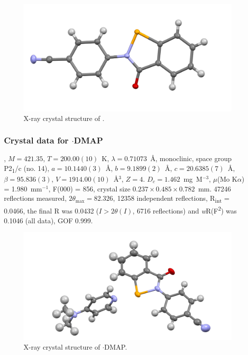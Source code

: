 \begin{refsection}
\begin{figure}
  \includegraphics[width=0.6\linewidth]{Figures/ebs-4cn-xtal.pdf}
  \caption{X-ray crystal structure of \texorpdfstring{}{C14 H8 N2 O Se}.}
\end{figure}

\subsubsection{Crystal data for \texorpdfstring{$ \cdot $DMAP}{C21 H18 N4 O Se}}
, $M=421.35$, $T=200.00(10)$~K, $ \lambda=0.71073 $~\AA, monoclinic, space group P2\textsubscript{1}/c (no. 14), $a = 10.1440(3)$~\AA, $b = 9.1899(2)$~\AA, $c = 20.6385(7)$~\AA, $\beta = 95.836(3)$\degree, $V = 1914.00(10)$~\AA$^{3}$, $Z = 4$. $D_{c}= 1.462$~mg~M$^{-3}$, $\mu$(Mo K$\alpha$) = 1.980~mm$^{-1}$, F(000) = 856, crystal size $0.237 \times 0.485 \times 0.782$~mm. 47246 reflections measured, $2\theta_{\max}=82.326$\degree, 12358 independent reflections, R\textsubscript{int} = 0.0466, the final R was 0.0432 ($I > 2\theta(I)$, 6716 reflections) and \textit{w}R(F\textsuperscript{2}) was 0.1046 (all data), GOF 0.999.

\begin{figure}
  \includegraphics[width=0.6\linewidth]{Figures/ebs-4cn-dmap-xtal.pdf}
  \caption{X-ray crystal structure of \texorpdfstring{$ \cdot $DMAP}{C21 H18 N4 O Se}.}
\end{figure}


\end{refsection}
